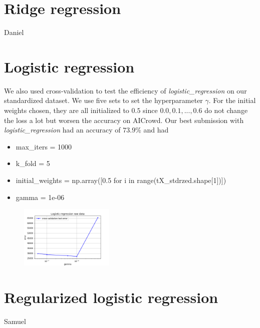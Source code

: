 \documentclass[11pt, a4paper, twoside]{article}
\begin{document}
\section{Ridge regression}
Daniel

\section{Logistic regression}
We also used cross-validation to test the efficiency of
\textit{logistic\_regression} on our standardized dataset.
We use five sets to set the hyperparameter $\gamma$.
For the initial weights chosen, they are all initialized to $0.5$ since $0.0, 0.1, ..., 0.6$ do not change the loss a lot but worsen the accuracy on AICrowd.
Our best submission with \textit{logistic\_regression} had an accuracy of $73.9\%$ and had 
\begin{itemize}
  \item max\_iters = 1000
  \item k\_fold = 5
  \item initial\_weights = np.array([0.5 for i in range(tX\_stdrzed.shape[1])])
  \item gamma = 1e-06
\end{itemize}

\begin{figure}[h]
  \includegraphics[width=0.4\textwidth]{raw_data_logistic_regression.png}
    \label{fig:log_reg}
\end{figure}

\section{Regularized logistic regression}
Samuel
\end{document}
